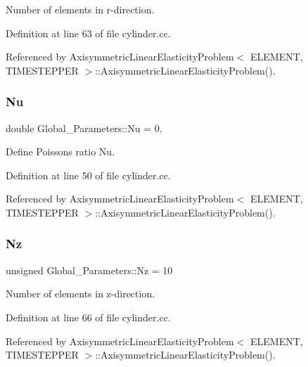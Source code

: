 Number of elements in r-\/direction. 



Definition at line 63 of file cylinder.\+cc.



Referenced by Axisymmetric\+Linear\+Elasticity\+Problem$<$ E\+L\+E\+M\+E\+N\+T, T\+I\+M\+E\+S\+T\+E\+P\+P\+E\+R $>$\+::\+Axisymmetric\+Linear\+Elasticity\+Problem().

\mbox{\label{namespaceGlobal__Parameters_a20fccdcfa2c15ad8b951b9ada3bb1661}} 
\subsubsection{\texorpdfstring{Nu}{Nu}}
{\footnotesize\ttfamily double Global\+\_\+\+Parameters\+::\+Nu = 0.}



Define Poisson\textquotesingle{}s ratio Nu. 



Definition at line 50 of file cylinder.\+cc.



Referenced by Axisymmetric\+Linear\+Elasticity\+Problem$<$ E\+L\+E\+M\+E\+N\+T, T\+I\+M\+E\+S\+T\+E\+P\+P\+E\+R $>$\+::\+Axisymmetric\+Linear\+Elasticity\+Problem().

\mbox{\label{namespaceGlobal__Parameters_a1f35a0690c7745167a7178fb71f92e6e}} 
\subsubsection{\texorpdfstring{Nz}{Nz}}
{\footnotesize\ttfamily unsigned Global\+\_\+\+Parameters\+::\+Nz = 10}



Number of elements in z-\/direction. 



Definition at line 66 of file cylinder.\+cc.



Referenced by Axisymmetric\+Linear\+Elasticity\+Problem$<$ E\+L\+E\+M\+E\+N\+T, T\+I\+M\+E\+S\+T\+E\+P\+P\+E\+R $>$\+::\+Axisymmetric\+Linear\+Elasticity\+Problem().

